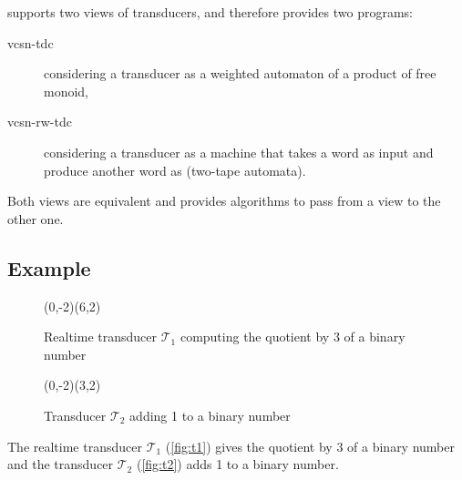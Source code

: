 \Vauc supports two views of transducers, and therefore provides two
programs:
\begin{description}
\item[vcsn-tdc] considering a transducer as a weighted automaton of a
  product of free monoid,
\item[vcsn-rw-tdc] considering a transducer as a machine that takes a
  word as input and produce another word as (two-tape automata).
\end{description}
Both views are equivalent and \Vauc provides algorithms to pass from a
view to the other one.

\subsection{Example}

\begin{figure}[tp]
  \begin{center}
    \begin{VCPicture}{(0,-2)(6,2)}
        
    \end{VCPicture}
    \caption{Realtime transducer $\mathcal{T}_1$ computing the
      quotient by 3 of a binary number}
    \label{fig:t1}
  \end{center}
\end{figure}

\begin{figure}[tp]
  \begin{center}
    \begin{VCPicture}{(0,-2)(3,2)}
       
    \end{VCPicture}
    \caption{Transducer $\mathcal{T}_2$ adding 1 to a binary number}
    \label{fig:t2}
  \end{center}
\end{figure}

The realtime transducer $\mathcal{T}_1$ (\autoref{fig:t1}) gives the
quotient by 3 of a binary number and the transducer $\mathcal{T}_2$
(\autoref{fig:t2}) adds 1 to a binary number.


